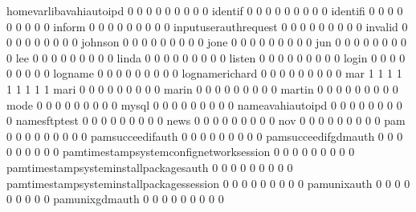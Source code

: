 \documentclass[compress,8pt]{beamer}
\begin{document}
\begin{frame}
\begin{Schunk}
  homevarlibavahiautoipd                     0   0   0   0   0   0   0   0   0
  identif                                    0   0   0   0   0   0   0   0   0
  identifi                                   0   0   0   0   0   0   0   0   0
  inform                                     0   0   0   0   0   0   0   0   0
  inputuserauthrequest                       0   0   0   0   0   0   0   0   0
  invalid                                    0   0   0   0   0   0   0   0   0
  johnson                                    0   0   0   0   0   0   0   0   0
  jone                                       0   0   0   0   0   0   0   0   0
  jun                                        0   0   0   0   0   0   0   0   0
  lee                                        0   0   0   0   0   0   0   0   0
  linda                                      0   0   0   0   0   0   0   0   0
  listen                                     0   0   0   0   0   0   0   0   0
  login                                      0   0   0   0   0   0   0   0   0
  logname                                    0   0   0   0   0   0   0   0   0
  lognamerichard                             0   0   0   0   0   0   0   0   0
  mar                                        1   1   1   1   1   1   1   1   1
  mari                                       0   0   0   0   0   0   0   0   0
  marin                                      0   0   0   0   0   0   0   0   0
  martin                                     0   0   0   0   0   0   0   0   0
  mode                                       0   0   0   0   0   0   0   0   0
  mysql                                      0   0   0   0   0   0   0   0   0
  nameavahiautoipd                           0   0   0   0   0   0   0   0   0
  namesftptest                               0   0   0   0   0   0   0   0   0
  news                                       0   0   0   0   0   0   0   0   0
  nov                                        0   0   0   0   0   0   0   0   0
  pam                                        0   0   0   0   0   0   0   0   0
  pamsucceedifauth                           0   0   0   0   0   0   0   0   0
  pamsucceedifgdmauth                        0   0   0   0   0   0   0   0   0
  pamtimestampsystemconfignetworksession     0   0   0   0   0   0   0   0   0
  pamtimestampsysteminstallpackagesauth      0   0   0   0   0   0   0   0   0
  pamtimestampsysteminstallpackagessession   0   0   0   0   0   0   0   0   0
  pamunixauth                                0   0   0   0   0   0   0   0   0
  pamunixgdmauth                             0   0   0   0   0   0   0   0   0

\end{Schunk}
\end{frame}
\end{document}
